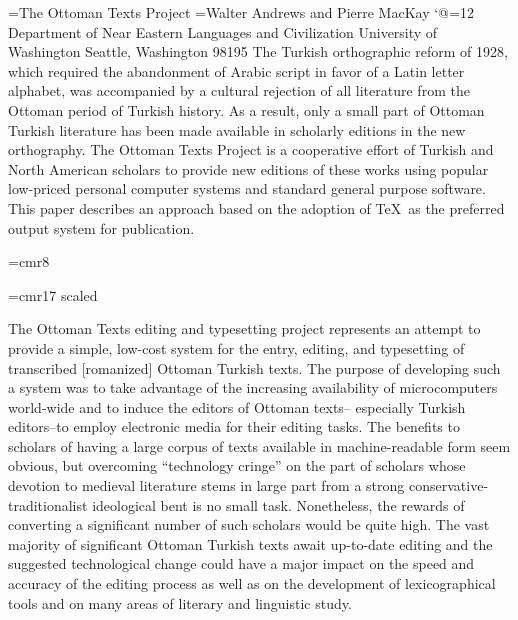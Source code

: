 \doctitle={The Ottoman Texts Project}
\authorname={Walter Andrews and Pierre MacKay}
\def\ninebig#1{{\hbox{$\textfont0=\tenrm\textfont2=\tensy
   \left#1\vbox to7.25pt{}\right.\n@space$}}}
\catcode`@=12 %
\tenrm
\begingroup
\titlefont
\the\doctitle\hfil
\vskip 3pc
\namefont\the\authorname\hfil
\tenrm
\vskip 1pc
{\obeylines
Department of Near Eastern Languages and Civilization
University of Washington
Seattle, Washington 98195
}
\vskip 3pc
\vskip 3pc
\leftskip 4pc \rightskip 4pc
The Turkish orthographic reform of 1928, which required the abandonment
of Arabic script in favor of a Latin letter alphabet, was accompanied
by a cultural rejection of all literature from the
Ottoman period of Turkish history.  As a result, only a small part of 
Ottoman Turkish literature has been made available in scholarly editions
in the new orthography.  The Ottoman Texts Project is a cooperative
effort of Turkish and North American scholars to provide new editions
of these works using popular low-priced personal computer systems and
standard general purpose software.  This paper describes an approach
based on the adoption of \TeX\ as the preferred output system for
publication.
\par
\endgroup
\vskip 3pc
\font\eightrm=cmr8
\def\sc{\eightrm}

\font\huge=cmr17 scaled 
\def\dropinitial#1#2{\def\biginitial#1{{\huge#1}}%
  \def\makeinitial#1{\setbox8\hbox{\strut\vbox to 1.3ex
    {\hbox{\biginitial#1}\vskip -4pc plus 3.5pc minus 3.5pc}}}%
  \makeinitial#1%
  \ifdim\parindent>1.3\wd8\dimen8=\parindent
     \else\dimen8=1.3\wd8\fi
  \hangindent=\dimen8\hangafter=-2
  \noindent
  \strut\hskip-1\dimen8\box8{\sc#2}}%

\noindent
The Ottoman Texts editing and typesetting project
represents an attempt to provide a simple, low-cost
system for the entry, editing, and typesetting of
transcribed [romanized] Ottoman Turkish texts.  The
purpose of developing such a system was to take advantage
of the increasing availability of microcomputers
world-wide and to induce the editors of Ottoman texts--
especially Turkish editors--to employ electronic media
for their editing tasks.  The benefits to scholars of
having a large corpus of texts available in
machine-readable form seem obvious, but overcoming
``technology cringe'' on the part of scholars whose
devotion to medieval literature stems in large part from
a strong conservative-traditionalist ideological bent is
no small task.  Nonetheless, the rewards of converting a
significant number of such scholars would be quite high.
The vast majority of significant Ottoman Turkish texts
await up-to-date editing and the suggested technological
change could have a major impact on the speed and
accuracy of the editing process as well as on the
development of lexicographical tools and on many areas of
literary and linguistic study.

